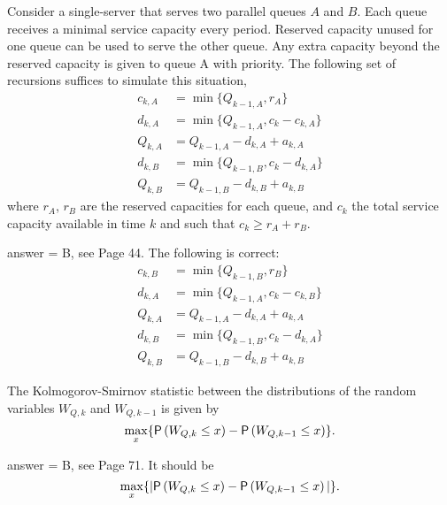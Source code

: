 \begin{exercise}[201803]
 Consider a single-server that  serves two parallel queues $A$ and $B$. Each queue receives a minimal service   capacity every period. Reserved capacity unused for one queue can be
  used to serve the other queue. Any extra capacity beyond the
  reserved capacity is given to queue A with priority. The following set
  of recursions suffices to simulate this situation,
\begin{align*}
  c_{k,A} &= \min\{Q_{ k-1, A}, r_A\}\\
d_{k,A} &= \min\{Q_{k-1, A}, c_k-c_{k,A}\}\\
Q_{k,A} &= Q_{k-1, A} - d_{k,A} + a_{k,A}\\
d_{k,B} &= \min\{Q_{k-1, B}, c_k-d_{k,A}\} \\
Q_{k,B} &= Q_{k-1, B} - d_{k,B} + a_{k,B}
\end{align*}
where $r_A$, $r_B$ are the reserved capacities for each queue, and $c_k$ the total service capacity available in time $k$ and such that $c_k \geq r_A+r_B$.

\begin{solution}
answer = B, see Page 44. The following is correct: 
\begin{align*}
  c_{k,B} &= \min\{Q_{ k-1, B}, r_B\}\\
d_{k,A} &= \min\{Q_{k-1, A}, c_k-c_{k,B}\}\\
Q_{k,A} &= Q_{k-1, A} - d_{k,A} + a_{k,A}\\
d_{k,B} &= \min\{Q_{k-1, B}, c_k-d_{k,A}\}\\
Q_{k,B} &= Q_{k-1, B} - d_{k,B} + a_{k,B}
\end{align*}
\end{solution}
\end{exercise}

\begin{exercise}[201803]
The Kolmogorov-Smirnov statistic between the distributions of the random variables $W_{Q,k}$ and $W_{Q,k-1}$ is given by
\begin{equation*}
  \max_x\{ \P{W_{Q,k}\leq x} - \P{W_{Q,k-1}\leq x}\}.
\end{equation*}

\begin{solution}
answer = B, see Page 71. It should be
\begin{equation*}
  \max_x\{|\P{W_{Q,k}\leq x} - \P{W_{Q,k-1}\leq x}|\}.
\end{equation*}

\end{solution}
\end{exercise}


